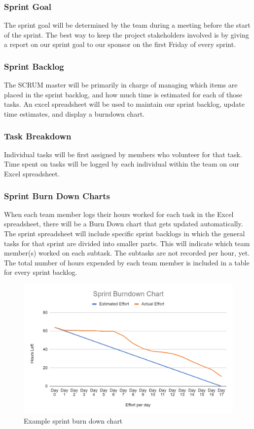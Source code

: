 \subsubsection{Sprint Goal}
The sprint goal will be determined by the team during a meeting before the start of the sprint. The best way to keep the project stakeholders involved is by giving a report on our sprint goal to our sponsor on the first Friday of every sprint.

\subsubsection{Sprint Backlog}
The SCRUM master will be primarily in charge of managing which items are placed in the sprint backlog, and how much time is estimated for each of those tasks. An excel spreadsheet will be used to maintain our sprint backlog, update time estimates, and display a burndown chart.

\subsubsection{Task Breakdown}
Individual tasks will be first assigned by members who volunteer for that task. Time spent on tasks will be logged by each individual within the team on our Excel spreadsheet.

\subsubsection{Sprint Burn Down Charts}
When each team member logs their hours worked for each task in the Excel spreadsheet, there will be a Burn Down chart that gets updated automatically. The sprint spreadsheet will include specific sprint backlogs in which the general tasks for that sprint are divided into smaller parts. This will indicate which team member(s) worked on each subtask. The subtasks are not recorded per hour, yet. The total number of hours expended by each team member is included in a table for every sprint backlog.

\begin{figure}[h!]
    \centering
    \includegraphics[width=1\textwidth]{images/burndown_example.png}
    \caption{Example sprint burn down chart}
\end{figure}

